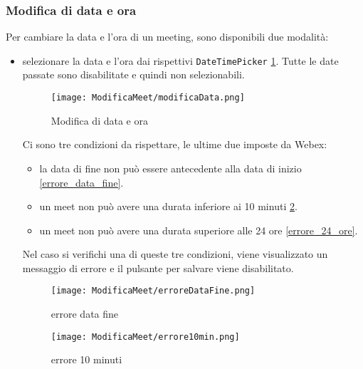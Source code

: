\subsubsection{Modifica di data e ora}
Per cambiare la data e l'ora di un meeting, sono disponibili due modalità: 
\begin{itemize}
    \item selezionare la data e l'ora dai rispettivi \texttt{DateTimePicker} \ref{modifica_di_data_e_ora}. 
    Tutte le date passate sono disabilitate e quindi non selezionabili.
    \begin{figure}[H]   
        \centering
        \texttt{[image: ModificaMeet/modificaData.png]}
        \caption{Modifica di data e ora}
        \label{modifica_di_data_e_ora}
    \end{figure}
    Ci sono tre condizioni da rispettare, le ultime due imposte da Webex: 
        \begin{itemize}
            \item la data di fine non può essere antecedente alla data di inizio \ref{errore_data_fine}.
            \item un meet non può avere una durata inferiore ai 10 minuti \ref{errore_10_minuti}.
            \item un meet non può avere una durata superiore alle 24 ore \ref{errore_24_ore}.
        \end{itemize}
    Nel caso si verifichi una di queste tre condizioni, viene visualizzato un messaggio di errore e il pulsante per salvare viene disabilitato.
    \begin{figure}[H]
        \centering
        \begin{minipage}{0.45\textwidth}
            \centering
            \texttt{[image: ModificaMeet/erroreDataFine.png]}
            \caption{errore data fine}
            \label{errore_data_fine}
        \end{minipage}
        \hspace{0.05\textwidth}
        \begin{minipage}{0.45\textwidth}
            \centering
            \texttt{[image: ModificaMeet/errore10min.png]}
            \caption{errore 10 minuti}
            \label{errore_10_minuti}
        \end{minipage}
        \hspace{0.05\textwidth}
        \begin{minipage}{0.45\textwidth}

\end{minipage}
\end{figure}
\end{itemize}
